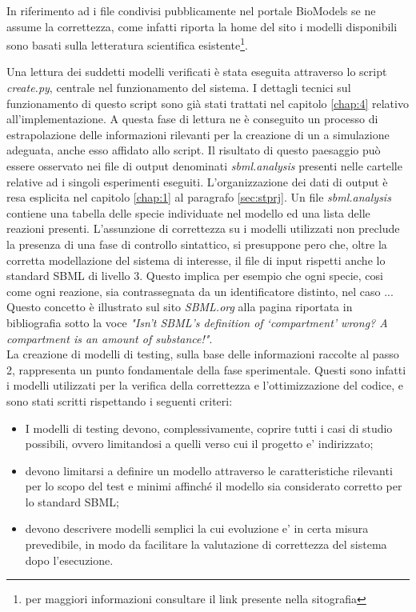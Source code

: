 \documentclass[Lau, oneside]{sapthesis}
\begin{document}
In riferimento ad i file condivisi pubblicamente nel portale BioModels se ne assume la correttezza, come infatti riporta la home del sito i modelli disponibili sono basati sulla letteratura scientifica esistente\footnote{per maggiori informazioni consultare il link presente nella sitografia}.

Una lettura dei suddetti modelli verificati \`e stata eseguita attraverso lo script \textit{create.py}, centrale nel funzionamento del sistema. I dettagli tecnici sul funzionamento di questo script sono già stati trattati nel capitolo \ref{chap:4} relativo all'implementazione. A questa fase di lettura ne \`e conseguito un processo di estrapolazione delle informazioni rilevanti per la creazione di un a simulazione adeguata, anche esso affidato allo script. Il risultato di questo paesaggio può essere osservato nei file di output denominati \textit{sbml.analysis} presenti nelle cartelle relative ad i singoli esperimenti eseguiti. L'organizzazione dei dati di output \`e resa esplicita nel capitolo \ref{chap:1} al paragrafo \ref{sec:stprj}.
Un file \textit{sbml.analysis} contiene una tabella delle specie individuate nel modello ed una lista delle reazioni presenti. L'assunzione di correttezza su i modelli utilizzati non preclude la presenza di una fase di controllo sintattico, si presuppone pero che, oltre la corretta modellazione del sistema di interesse, il file di input rispetti anche lo standard SBML di livello 3. Questo implica per esempio che ogni specie, cosi come ogni reazione, sia contrassegnata da un identificatore distinto, nel caso ...
Questo concetto \`e illustrato sul sito \textit{SBML.org} alla pagina riportata in bibliografia \cite{ref:sbmlfaq} sotto la voce \textit{"Isn’t SBML’s definition of ‘compartment’ wrong? A compartment is an amount of substance!"}.
\\

La creazione di modelli di testing, sulla base delle informazioni raccolte al passo 2, rappresenta un punto fondamentale della fase sperimentale. Questi sono infatti i modelli utilizzati per la verifica della correttezza e l'ottimizzazione del codice, e sono stati scritti rispettando i seguenti criteri:
\begin{itemize}
    \item I modelli di testing devono, complessivamente, coprire tutti i casi di studio possibili, ovvero limitandosi a quelli verso cui il progetto e’ indirizzato;
    \item devono limitarsi a definire un modello attraverso le caratteristiche rilevanti per lo scopo del test e minimi affinché il modello sia considerato corretto per lo standard SBML;
    \item devono descrivere modelli semplici la cui evoluzione e’ in certa misura prevedibile, in modo da facilitare la valutazione di correttezza del sistema dopo l’esecuzione.
\end{itemize}
\end{document}
